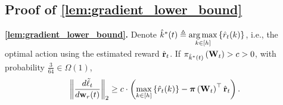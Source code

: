 \subsection{Proof of \cref{lem:gradient_lower_bound}}

{\bf \cref{lem:gradient_lower_bound}.} Denote $\hat{k}^*(t) \triangleq \operatorname*{arg\,max}\limits_{k \in [h]}\left\{ \hat{r}_{t}(k) \right\}$, i.e., the optimal action using the estimated reward $ \hat{{\mathbf{r}}}_t$. If $\pi_{\hat{k}^*(t)}\left({\mathbf{W}}_t\right) > c > 0$, with probability $\frac{3}{64} \in \Omega\left( 1 \right)$,
\begin{equation*}
\begin{split}
	\left\| \frac{d\tilde{\ell}_t}{d {\mathbf{w}}_r(t)} \right\|_2 \ge c \cdot \left( \max\limits_{k \in \left[h\right]}\left\{ \hat{r}_t(k) \right\} - {\boldsymbol{\pi}}\left( {\mathbf{W}}_t \right)^\top \hat{{\mathbf{r}}}_t \right) .
\end{split}
\end{equation*}
